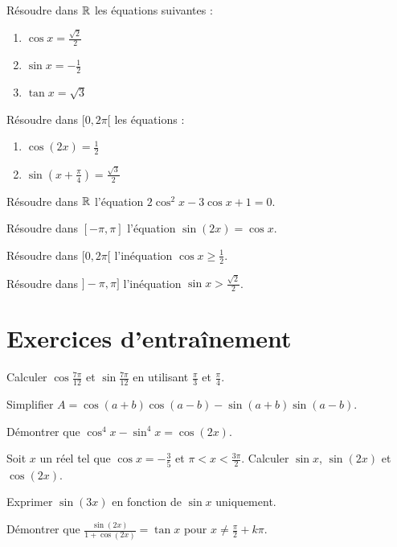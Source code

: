 
\exo{}
Résoudre dans $\mathbb{R}$ les équations suivantes :
\begin{enumerate}[label=\alph*)]
    \item $\cos x = \frac{\sqrt2}{2}$
    \item $\sin x = -\frac12$
    \item $\tan x = \sqrt3$
\end{enumerate}

\exo{}
Résoudre dans $[0,2\pi[$ les équations :
\begin{enumerate}[label=\alph*)]
    \item $\cos(2x) = \frac12$
    \item $\sin\left(x+\frac{\pi}{4}\right) = \frac{\sqrt3}{2}$
\end{enumerate}

\exo{}
Résoudre dans $\mathbb{R}$ l'équation $2\cos^2 x - 3\cos x + 1 = 0$.

\exo{}
Résoudre dans $[-\pi,\pi]$ l'équation $\sin(2x) = \cos x$.


\exo{}
Résoudre dans $[0,2\pi[$ l'inéquation $\cos x \ge \frac12$.

\exo{}
Résoudre dans $]-\pi,\pi]$ l'inéquation $\sin x > \frac{\sqrt2}{2}$.

\section{Exercices d'entraînement}


\exo{}
Calculer $\cos\frac{7\pi}{12}$ et $\sin\frac{7\pi}{12}$ en utilisant $\frac{\pi}{3}$ et $\frac{\pi}{4}$.

\exo{}
Simplifier $A = \cos(a+b)\cos(a-b) - \sin(a+b)\sin(a-b)$.

\exo{}
Démontrer que $\cos^4 x - \sin^4 x = \cos(2x)$.

\exo{}
Soit $x$ un réel tel que $\cos x = -\frac{3}{5}$ et $\pi < x < \frac{3\pi}{2}$. Calculer $\sin x$, $\sin(2x)$ et $\cos(2x)$.

\exo{}
Exprimer $\sin(3x)$ en fonction de $\sin x$ uniquement.

\exo{}
Démontrer que $\frac{\sin(2x)}{1+\cos(2x)} = \tan x$ pour $x \neq \frac{\pi}{2} + k\pi$.

